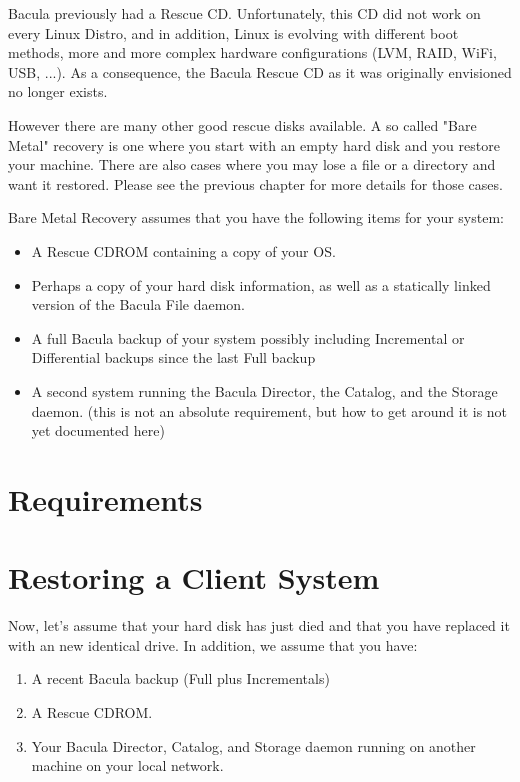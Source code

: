 Bacula previously had a Rescue CD.  Unfortunately, this CD did not work
on every Linux Distro, and in addition, Linux is evolving with different
boot methods, more and more complex hardware configurations (LVM, RAID, 
WiFi, USB, ...).  As a consequence, the Bacula Rescue CD as it was
originally envisioned no longer exists.

However there are many other good rescue disks available.
A so called "Bare Metal" recovery is one where you start with an empty hard
disk and you restore your machine. There are also cases where you may lose a
file or a directory and want it restored. Please see the previous chapter for
more details for those cases. 

Bare Metal Recovery assumes that you have the following items for your system:

\begin{itemize}
\item A Rescue CDROM containing a copy of your OS.
\item Perhaps a copy of your
   hard disk information, as well as a statically linked version of the
   Bacula File daemon.  
\item A full Bacula backup of your system possibly including  Incremental or
   Differential backups since the last Full  backup 
\item A second system running the Bacula Director, the Catalog, and the
   Storage daemon.  (this is not an absolute requirement, but how to get
   around it is not yet documented here)
\end{itemize}

\section{Requirements}


\label{restore_client}
\section{Restoring a Client System}

Now, let's assume that your hard disk has just died and that you have replaced
it with an new identical drive. In addition, we assume that you have: 

\begin{enumerate}
\item A recent Bacula backup (Full plus Incrementals)  
\item A Rescue CDROM.  
\item Your Bacula Director, Catalog, and Storage daemon running  on another
   machine on your local network. 
\end{enumerate}

